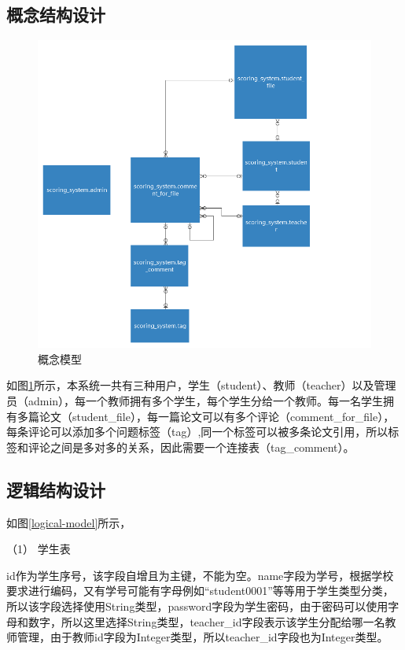 \subsection{概念结构设计}

\begin{figure}[htbp]
    \centering
    \includegraphics[scale = 0.5]{out/uml/数据库/conceptual-model.png}
    \caption{\song\wuhao 概念模型}
    \label{conceptual-model}
\end{figure}

如图\ref{conceptual-model}所示，本系统一共有三种用户，学生（student）、教师（teacher）以及管理员（admin），每一个教师拥有多个学生，每个学生分给一个教师。每一名学生拥有多篇论文（student\_file），每一篇论文可以有多个评论（comment\_for\_file），每条评论可以添加多个问题标签（tag）,同一个标签可以被多条论文引用，所以标签和评论之间是多对多的关系，因此需要一个连接表（tag\_comment）。

\subsection{逻辑结构设计}

如图\ref{logical-model}所示，

（1） 学生表

id作为学生序号，该字段自增且为主键，不能为空。name字段为学号，根据学校要求进行编码，又有学号可能有字母例如“student0001”等等用于学生类型分类，所以该字段选择使用String类型，password字段为学生密码，由于密码可以使用字母和数字，所以这里选择String类型，teacher\_id字段表示该学生分配给哪一名教师管理，由于教师id字段为Integer类型，所以teacher\_id字段也为Integer类型。

